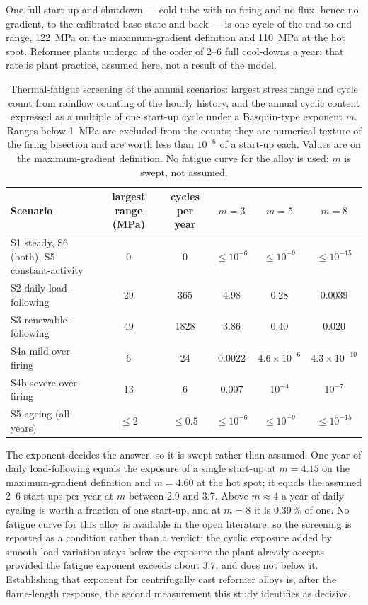 \documentclass[final,3p,times]{elsarticle}
\begin{document}
One full start-up and shutdown --- cold tube with no firing and no flux, hence no gradient,
to the calibrated base state and back --- is one cycle of the end-to-end range,
122~MPa on the maximum-gradient definition and 110~MPa at the hot spot. Reformer plants
undergo of the order of 2--6 full cool-downs a year; that rate is plant practice, assumed
here, not a result of the model.

\begin{table}[h]
\centering\footnotesize
\caption{Thermal-fatigue screening of the annual scenarios: largest stress range and cycle
count from rainflow counting of the hourly history, and the annual cyclic content
expressed as a multiple of one start-up cycle under a Basquin-type exponent $m$. Ranges
below 1~MPa are excluded from the counts; they are numerical texture of the firing
bisection and are worth less than $10^{-6}$ of a start-up each. Values are on the
maximum-gradient definition. No fatigue curve for the alloy is used: $m$ is swept, not
assumed.}
\label{tab:fatigue}
\begin{tabular}{lccccc}
\toprule
Scenario & largest range (MPa) & cycles per year & $m = 3$ & $m = 5$ & $m = 8$ \\
\midrule
S1 steady, S6 (both), S5 constant-activity & 0 & 0 & $\leq 10^{-6}$ & $\leq 10^{-9}$ & $\leq 10^{-15}$ \\
S2 daily load-following & 29 & 365 & 4.98 & 0.28 & 0.0039 \\
S3 renewable-following & 49 & 1828 & 3.86 & 0.40 & 0.020 \\
S4a mild over-firing & 6 & 24 & 0.0022 & $4.6\times10^{-6}$ & $4.3\times10^{-10}$ \\
S4b severe over-firing & 13 & 6 & 0.007 & $10^{-4}$ & $10^{-7}$ \\
S5 ageing (all years) & $\leq 2$ & $\leq 0.5$ & $\leq 10^{-6}$ & $\leq 10^{-9}$ & $\leq 10^{-15}$ \\
\bottomrule
\end{tabular}
\end{table}

The exponent decides the answer, so it is swept rather than assumed. One year of daily
load-following equals the exposure of a single start-up at $m = 4.15$ on the
maximum-gradient definition and $m = 4.60$ at the hot spot; it equals the assumed
2--6 start-ups per year at $m$ between 2.9 and 3.7. Above $m \approx 4$ a year of daily
cycling is worth a fraction of one start-up, and at $m = 8$ it is 0.39\,\% of one.
No fatigue curve for this alloy is available in the open
literature, so the screening is reported as a condition rather than a verdict: the
cyclic exposure added by smooth load variation stays below the exposure the plant
already accepts provided the fatigue exponent exceeds about 3.7, and does not below it.
Establishing that exponent for centrifugally cast reformer alloys is, after the
flame-length response, the second measurement this study identifies as decisive.
\end{document}
